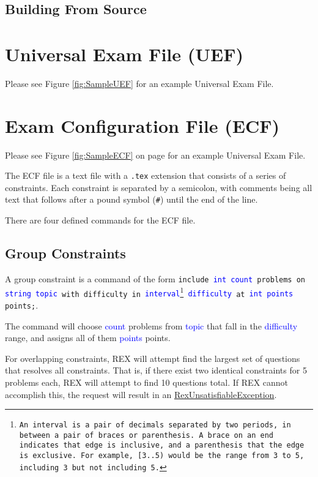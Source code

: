 \documentclass{article}
\begin{document}
\subsection{Building From Source}



\section{Universal Exam File (UEF)}

Please see Figure \ref{fig:SampleUEF} for an example Universal Exam File.

\section{Exam Configuration File (ECF)}
Please see Figure \ref{fig:SampleECF} on page \pageref{fig:SampleECF} for an example Universal Exam File.

The ECF file is a text file with a \texttt{.tex} extension that consists
of a series of constraints. Each constraint is separated by a semicolon,
with comments being all text that follows after a pound symbol 
(\texttt{\#}) until the end of the line.

There are four defined commands for the ECF file.

\subsection{Group Constraints}
A group constraint is a command of the form \texttt{include \textcolor{blue}{int count}
problems on \textcolor{blue}{string topic} with difficulty in \textcolor{blue}{interval\footnote{An interval is a pair of decimals separated by two periods, in between a pair of braces or parenthesis. A brace on an end indicates that edge is inclusive, and a parenthesis that the edge is exclusive. For example, \texttt{[3..5)} would be the range from 3 to 5, including 3 but not including 5.} difficulty} at \textcolor{blue}{int points} points;}.

The command will choose \textcolor{blue}{count} problems from \textcolor{blue}{topic} that fall in the \textcolor{blue}{difficulty} range, and assigns all of them \textcolor{blue}{points} points.

For overlapping constraints, REX will attempt find the largest set of questions that resolves all constraints. That is, if there exist two identical constraints for 5 problems each, REX will attempt to find 10 questions total. If REX cannot accomplish this, the request will result in an \hyperref[RexUnsatisfiableException]{RexUnsatisfiableException}. 
\end{document}
